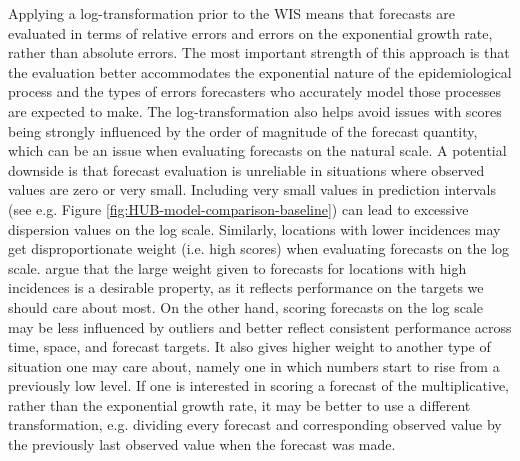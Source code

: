 \documentclass{article}
\begin{document}
Applying a log-transformation prior to the WIS means that forecasts are evaluated in terms of relative errors and errors on the exponential growth rate, rather than absolute errors. The most important strength of this approach is that the evaluation better accommodates the exponential nature of the epidemiological process and the types of errors forecasters who accurately model those processes are expected to make. The log-transformation also helps avoid issues with scores being strongly influenced by the order of magnitude of the forecast quantity, which can be an issue when evaluating forecasts on the natural scale. 
A potential downside is that forecast evaluation is unreliable in situations where observed values are zero or very small. Including very small values in prediction intervals (see e.g. Figure \ref{fig:HUB-model-comparison-baseline}) can lead to excessive dispersion values on the log scale. 
Similarly, locations with lower incidences may get disproportionate weight (i.e. high scores) when evaluating forecasts on the log scale. \cite{bracherEvaluatingEpidemicForecasts2021} argue that the large weight given to forecasts for locations with high incidences is a desirable property, as it reflects performance on the targets we should care about most. On the other hand, scoring forecasts on the log scale may be less influenced by outliers and better reflect consistent performance across time, space, and forecast targets. It also gives higher weight to another type of situation one may care about, namely one in which numbers start to rise from a previously low level. 
If one is interested in scoring a forecast of the multiplicative, rather than the exponential growth rate, it may be better to use a different transformation, e.g. dividing every forecast and corresponding observed value by the previously last observed value when the forecast was made. 
\end{document}
